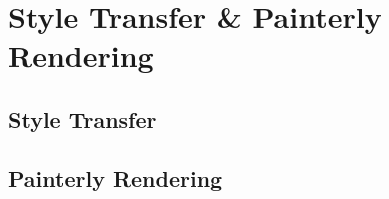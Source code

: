 \setchapterpreamble[u]{\margintoc}
\chapter{Style Transfer \& Painterly Rendering}

\section{Style Transfer}

\section{Painterly Rendering}

